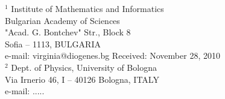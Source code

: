 \documentclass[twoside,reqno,11pt]{fcaa}
\begin{document}

 \bigskip \smallskip

 \it

 \noindent
$^1$ Institute of Mathematics and Informatics \\
Bulgarian Academy of Sciences \\
"Acad. G. Bontchev" Str., Block 8 \\
Sofia -- 1113, BULGARIA  \\[4pt]
e-mail: virginia@diogenes.bg
\hfill Received: November 28, 2010 \\[12pt]
$^2$ Dept. of Physics, University of Bologna\\
Via Irnerio 46, I -- 40126 Bologna, ITALY \\[4pt]
e-mail: .....
\end{document}
